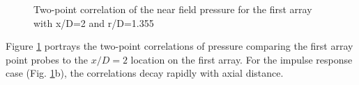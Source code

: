 \documentclass[english]{aiaa-tc}
\begin{document}
\begin{figure}
\begin{centering}
\end{centering}
\caption{Two-point correlation of the near field pressure for the first array with x/D=2 and r/D=1.355}\label{2ptCorrel}
\end{figure}
Figure \ref{2ptCorrel} portrays the two-point correlations of pressure comparing the first array point probes to the $x/D=2$ location on the first array. For the impulse response case (Fig. \ref{2ptCorrel}b), the correlations decay rapidly with axial distance.
\end{document}
